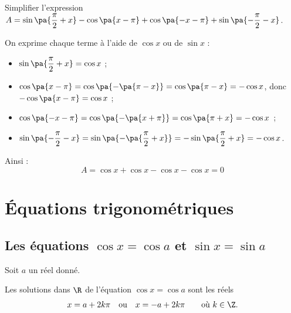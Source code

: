 \begin{methode}
	Simplifier l'expression $A = \sin\pa{\dfrac{\pi}{2} + x} - \cos\pa{x - \pi} + \cos\pa{-x - \pi} + \sin\pa{-\dfrac{\pi}{2} - x}$.

	\begin{correction}
		On exprime chaque terme à l'aide de $\cos x$ ou de $\sin x$ :

		\begin{itemize}
			\item $\sin\pa{\dfrac{\pi}{2} + x} = \cos x$ ;
			\item $\cos\pa{x - \pi} = \cos\pa{-\pa{\pi - x}} = \cos\pa{\pi - x} = -\cos x$, donc $-\cos\pa{x - \pi} = \cos x$ ;
			\item $\cos\pa{-x - \pi} = \cos\pa{-\pa{x + \pi}} = \cos\pa{\pi + x} = -\cos x$ ;
			\item $\sin\pa{-\dfrac{\pi}{2} - x} = \sin\pa{-\pa{\dfrac{\pi}{2} + x}} = -\sin\pa{\dfrac{\pi}{2} + x} = -\cos x$.
		\end{itemize}

		Ainsi :
		\[
			A = \cos x + \cos x - \cos x - \cos x = 0
		\]
	\end{correction}
\end{methode}

\section{Équations trigonométriques}

\subsection{Les équations $\cos x = \cos a$ et $\sin x = \sin a$}

\begin{prop}
	Soit $a$ un réel donné.

	Les solutions dans $\R$ de l'équation $\cos x = \cos a$ sont les réels
	\[
		x = a + 2k\pi \quad\text{ou}\quad x = -a + 2k\pi \qquad\text{où } k \in \Z.
	\]
\end{prop}


